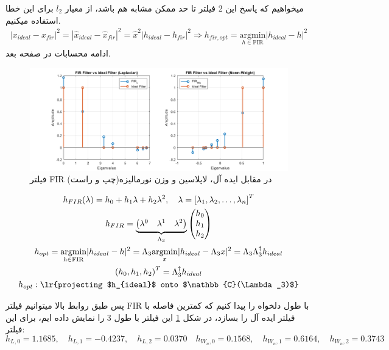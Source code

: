 میخواهیم که پاسخ این 2 فیلتر تا حد ممکن مشابه هم باشد، از معیار $l_2$ برای این خطا استفاده میکنیم.
\begin{gather*}
	|x_{ideal}-x_{fir}|^2=|\hat{x}_{ideal}-\hat{x}_{fir}|^2=\hat{x}^2|h_{ideal}-h_{fir}|^2\Rightarrow h_{fir,opt}=\underset{h\in\text{FIR}}{\mathrm{argmin}}|h_{ideal}-h|^2
\end{gather*}
ادامه محسابات در صفحه بعد.
\begin{figure}[h]
	\centering
	\includegraphics*[width=\linewidth]{../results/Q1/FIR_filt.png}
	\vspace*{-1em}
	\caption{
		فیلتر FIR در مقابل ایده آل، لاپلاسین و وزن نورمالیزه(چپ و راست)
	}
	\label{fig:fir_filt}
\end{figure}

\clearpage

\begin{gather*}
	h_{FIR}(\lambda)=h_0+h_1\lambda+h_2\lambda^2,\quad \lambda=\left[\lambda_1,\lambda_2,\dots,\lambda_n\right]^T\\
	h_{FIR} =
	\underbrace{\begin{pmatrix}
			\lambda^0 & \lambda^1 & \lambda^2
		\end{pmatrix}}_{\Lambda_3}\begin{pmatrix}
		h_0 \\h_1\\h_2
	\end{pmatrix}\\
	h_{opt}=\underset{h\in\text{FIR}}{\mathrm{argmin}}|h_{ideal}-h|^2=\Lambda_3\underset{x}{\mathrm{argmin}}|h_{ideal}-\Lambda_3x|^2=\Lambda_3\Lambda_3^\dagger h_{ideal}\\
	\left(h_0,h_1,h_2\right)^T=\Lambda_3^\dagger h_{ideal}\\
	h_{opt}:\text{\lr{projecting $h_{ideal}$ onto $\mathbb{C}(\Lambda_3)$}}
\end{gather*}

پس طبق روابط بالا میتوانیم فیلتر FIR با طول دلخواه را پیدا کنیم که کمترین فاصله با فیلتر ایده آل را بسازد، در شکل \ref{fig:fir_filt} این فیلتر با طول 3 را نمایش داده ایم،
برای این فیلتر:
\[
	h_{L,0}=1.1685,\quad h_{L,1}=-0.4237,\quad h_{L,2}=0.0370\quad h_{W_n,0}=0.1568,\quad h_{W_n,1}=0.6164,\quad h_{W_n,2}=0.3743
\]

